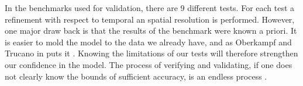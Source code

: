 \begin{comment}
Three aspects have been identified in the process of validating a computational model \cite{oberkampf2008verification}. These are: quantifying the accuracy of the model by comparing responses with experimental responses, interpolation of the model to conditions corresponding to the intended use and determining the accuracy of the model for the conditions under which its meant to be used. \newline
\end{comment}

In the benchmarks used for validation, there are 9 different tests. For each test a refinement with respect to temporal an spatial resolution is performed. However, one major draw back is that the results of the benchmark were known a priori. It is easier to mold the model to the data we already have, and as Oberkampf and Trucano in \cite{oberkampf2008verification} puts it . Knowing the limitations of our tests will therefore strengthen our confidence in the model. The process of verifying and validating, if one does not clearly know the bounds of sufficient accuracy, is an endless process \cite{oberkampf2008verification}. 


%











